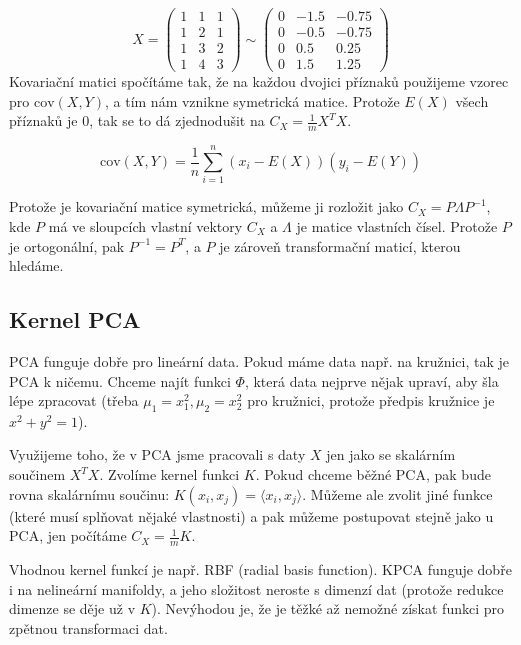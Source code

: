 \begin{equation}
X = 
\left( \begin{array}{ccc}
1 & 1 & 1\\
1 & 2 & 1\\
1 & 3 & 2\\
1 & 4 & 3 \end{array} \right)
%
\sim
%
\left( \begin{array}{ccc}
0 & -1.5 & -0.75\\
0 & -0.5 & -0.75\\
0 & 0.5 & 0.25\\
0 & 1.5 & 1.25 \end{array} \right)
\end{equation}
Kovariační matici spočítáme tak, že na každou dvojici příznaků použijeme vzorec pro $\text{cov}(X, Y)$, a tím nám vznikne symetrická matice. Protože $E(X)$ všech příznaků je 0, tak se to dá zjednodušit na $C_X = \frac{1}{m}X^TX$.

\begin{equation}
\text{cov}(X,Y) = \frac{1}{n} \sum_{i=1}^n (x_i-E(X))(y_i-E(Y))
\end{equation}

Protože je kovariační matice symetrická, můžeme ji rozložit jako $C_X = P\Lambda P^{-1}$, kde $P$ má ve sloupcích vlastní vektory $C_X$ a $\Lambda$ je matice vlastních čísel. Protože $P$ je ortogonální, pak $P^{-1}=P^T$, a $P$ je zároveň transformační maticí, kterou hledáme.

\subsection{Kernel PCA}

PCA funguje dobře pro lineární data. Pokud máme data např. na kružnici, tak je PCA k ničemu. Chceme najít funkci $\Phi$, která data nejprve nějak upraví, aby šla lépe zpracovat (třeba $\mu_1 = x_1^2, \mu_2 = x_2^2$ pro kružnici, protože předpis kružnice je $x^2+y^2=1$).

Využijeme toho, že v PCA jsme pracovali s daty $X$ jen jako se skalárním součinem $X^TX$. Zvolíme kernel funkci $K$. Pokud chceme běžné PCA, pak bude rovna skalárnímu součinu: $K(x_i, x_j) = \langle x_i, x_j\rangle$. Můžeme ale zvolit jiné funkce (které musí splňovat nějaké vlastnosti) a pak můžeme postupovat stejně jako u PCA, jen počítáme $C_X = \frac{1}{m}K$.

Vhodnou kernel funkcí je např. RBF (radial basis function). KPCA funguje dobře i na nelineární manifoldy, a jeho složitost neroste s dimenzí dat (protože redukce dimenze se děje už v $K$). Nevýhodou je, že je těžké až nemožné získat funkci pro zpětnou transformaci dat.

